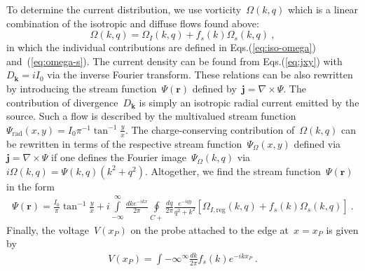 \documentclass[preprint,aps,eqsecnum, prb]{revtex4-1}
\begin{document}
To determine the current distribution, we use vorticity~$\Omega(k, q)$
which is a linear combination of the isotropic and diffuse flows found
above: 
\begin{equation}
  \Omega(k, q) = \Omega_{I}(k, q) + f_{s}(k) \Omega_{s}(k, q)
\ ,
\end{equation}
in which the individual contributions are defined in Eqs.(\ref{eq:iso-omega})
and~(\ref{eq:omega-s}). The current density can be found
from Eqs.(\ref{eq:jxy}) with~$D_{\bm k} = i I_0$
via the inverse Fourier transform. These relations
can be also rewritten by introducing the stream function~$\Psi({\bm r})$
defined by~${\bm j} = \nabla \times \Psi$. The
contribution of divergence~$D_{\bm k}$ is simply an isotropic
radial current emitted by the source. Such a flow is described
by the multivalued stream
function~$\Psi_\mathrm{rad}(x, y) = I_0 \pi^{-1}\tan^{-1} \frac{y}{x}$.
The charge-conserving
contribution of~$\Omega(k, q)$ can be rewritten in terms of
the respective stream function~$\Psi_\Omega(x, y)$
defined via~${\bm j} = \nabla \times \Psi$ if one defines
the Fourier image~$\Psi_\Omega(k, q)$ via
$i\Omega(k, q) = \Psi(k, q)(k^2 + q^2)$. Altogether, we find
the stream function~$\Psi({\bm r})$ in the form
\begin{align}
  \Psi({\bm r}) = \frac{I_0}{\pi} \tan^{-1}\frac{y}{x}
  + i\int\limits_{-\infty}^{\infty} \frac{dk e^{-ikx}}{2\pi}
  \oint\limits_{C+} \frac{dq}{2\pi} \frac{e^{-iqy}}{q^2 + k^2}
  \left[\Omega_{I, \mathrm{reg}}(k, q)
  + f_s(k) \Omega_{s}(k, q) \right]\ .
\end{align}
Finally, the voltage~$V(x_P)$ on the probe attached to the edge at~$x = x_P$
is given by
\begin{align}
  V(x_P) =  \int\limits{-\infty}^{\infty} \frac{dk}{2\pi} f_s(k) e^{-ik x_P}
  \ .
\end{align}
\end{document}
